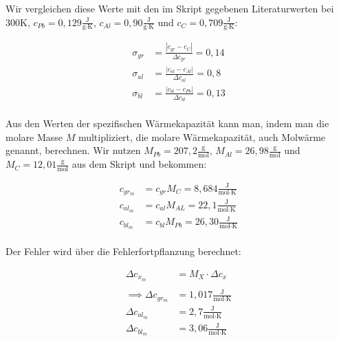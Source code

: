\documentclass{article}
\begin{document}
Wir vergleichen diese Werte mit den im Skript gegebenen Literaturwerten bei 300K, $c_{Pb} = 0,129 \frac{\text{J}}{\text{g} \cdot \text{K}}$, $c_{Al} = 0,90 \frac{\text{J}}{\text{g} \cdot \text{K}}$ und $c_{C} = 0,709 \frac{\text{J}}{\text{g} \cdot \text{K}}$:

\begin{equation}
    \begin{split}
        \sigma_{gr} &= \frac{|c_{gr} - c_{C}|}{\Delta c_{gr}} = 0,14 \\
        \sigma_{al} &= \frac{|c_{al} - c_{Al}|}{\Delta c_{al}} = 0,8  \\
        \sigma_{bl} &= \frac{|c_{bl} - c_{Pb}|}{\Delta c_{bl}} = 0,13 \\
    \end{split}
\end{equation}

Aus den Werten der spezifischen Wärmekapazität kann man, indem man die molare Masse $M$ multipliziert, die molare Wärmekapazität, auch Molwärme genannt, berechnen. Wir nutzen $M_{Pb} = 207,2 \frac{\text{g}}{\text{mol}}$, $M_{Al} = 26,98 \frac{\text{g}}{\text{mol}}$ und $M_{C} = 12,01 \frac{\text{g}}{\text{mol}}$ aus dem Skript und bekommen:

\begin{equation}
    \begin{split}
        c_{gr_m} &= c_{gr} M_{C} = 8,684 \frac{\text{J}}{\text{mol} \cdot \text{K}} \\
        c_{al_m} &= c_{al} M_{AL} = 22,1 \frac{\text{J}}{\text{mol} \cdot \text{K}} \\
        c_{bl_m} &= c_{bl} M_{Pb} = 26,30 \frac{\text{J}}{\text{mol} \cdot \text{K}} \\
    \end{split}
\end{equation}

Der Fehler wird über die Fehlerfortpflanzung berechnet:

\begin{equation}
    \begin{split}
        \Delta c_{x_m} &= M_X \cdot \Delta c_x \\ \\
        \implies \Delta c_{gr_m} &= 1,017 \frac{\text{J}}{\text{mol} \cdot \text{K}} \\
        \Delta c_{al_m} &= 2,7 \frac{\text{J}}{\text{mol} \cdot \text{K}} \\
        \Delta c_{bl_m} &= 3,06 \frac{\text{J}}{\text{mol} \cdot \text{K}} \\
    \end{split}
\end{equation}
\end{document}
